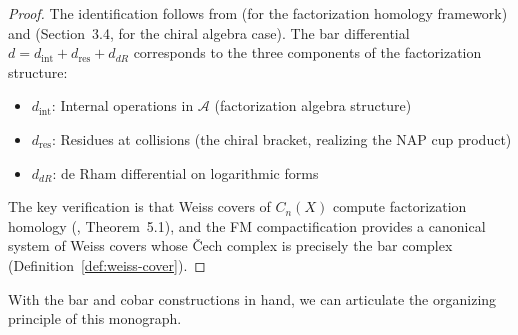 \begin{proof}
The identification follows from \cite{AF15} (for the factorization homology framework) and \cite{BD04} (Section~3.4, for the chiral algebra case).  The bar differential $d = d_{\text{int}} + d_{\text{res}} + d_{dR}$ corresponds to the three components of the factorization structure:
\begin{itemize}
\item $d_{\text{int}}$: Internal operations in $\mathcal{A}$ (factorization algebra structure)
\item $d_{\text{res}}$: Residues at collisions (the chiral bracket, realizing the NAP cup product)
\item $d_{dR}$: de Rham differential on logarithmic forms
\end{itemize}
The key verification is that Weiss covers of $C_n(X)$ compute factorization homology (\cite{AF15}, Theorem~5.1), and the FM compactification provides a canonical system of Weiss covers whose \v{C}ech complex is precisely the bar complex (Definition~\ref{def:weiss-cover}).
\end{proof}

With the bar and cobar constructions in hand, we can articulate the organizing principle of this monograph.

